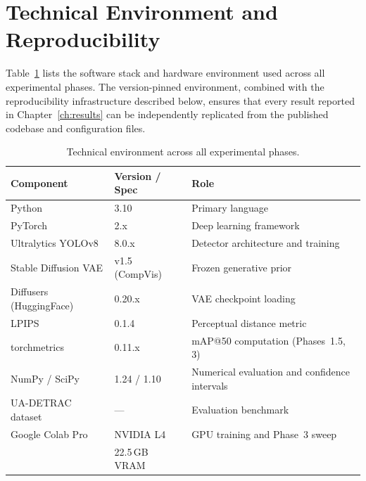 \documentclass[12pt,a4paper]{report}
\begin{document}
\section{Technical Environment and Reproducibility}
\label{sec:tech-env}

Table~\ref{tab:tech-env} lists the software stack and hardware
environment used across all experimental phases. The
version-pinned environment, combined with the reproducibility
infrastructure described below, ensures that every result
reported in Chapter~\ref{ch:results} can be independently
replicated from the published codebase and configuration files.

\begin{table}[htbp]
  \centering
  \caption{Technical environment across all experimental phases.}
  \label{tab:tech-env}
  \small
  \begin{tabular}{@{}ll p{5.5cm}@{}}
    \toprule
    \textbf{Component} & \textbf{Version / Spec} & \textbf{Role} \\
    \midrule
    Python             & 3.10             & Primary language \\
    PyTorch            & 2.x              & Deep learning framework \\
    Ultralytics YOLOv8 & 8.0.x            & Detector architecture
                                            and training \\
    Stable Diffusion VAE & v1.5 (CompVis) & Frozen generative prior \\
    Diffusers (HuggingFace) & 0.20.x      & VAE checkpoint loading \\
    LPIPS              & 0.1.4            & Perceptual distance metric
                                            \cite{zhang2018unreasonable} \\
    torchmetrics       & 0.11.x           & mAP@50 computation
                                            (Phases~1.5, 3) \\
    NumPy / SciPy      & 1.24 / 1.10      & Numerical evaluation
                                            and confidence intervals \\
    UA-DETRAC dataset  & ---              & Evaluation benchmark \\
    \midrule
    Google Colab Pro   & NVIDIA L4        & GPU training and
                                            Phase~3 sweep \\
                       & 22.5\,GB VRAM    & \\
    \bottomrule
  \end{tabular}
\end{table}
\end{document}
